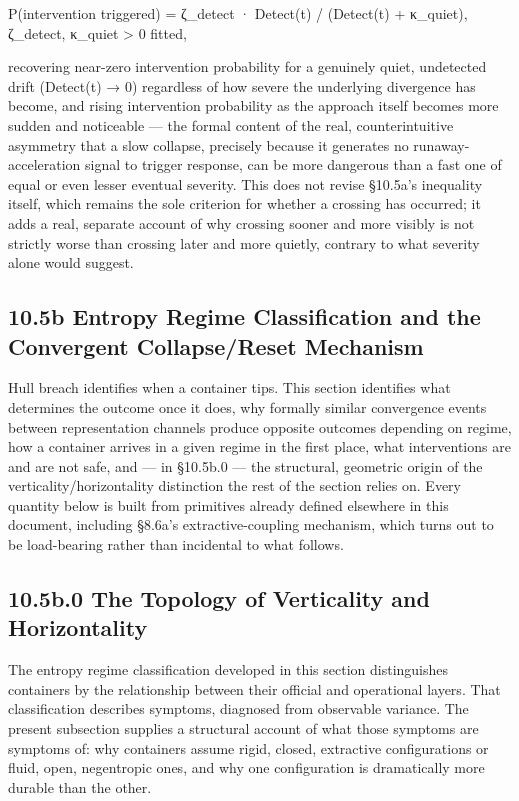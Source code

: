\documentclass[
]{article}
\begin{document}
P(intervention triggered) = ζ\_detect · Detect(t) / (Detect(t) +
κ\_quiet), ζ\_detect, κ\_quiet \textgreater{} 0 fitted,

recovering near-zero intervention probability for a genuinely quiet,
undetected drift (Detect(t) → 0) regardless of how severe the underlying
divergence has become, and rising intervention probability as the
approach itself becomes more sudden and noticeable --- the formal
content of the real, counterintuitive asymmetry that a slow collapse,
precisely because it generates no runaway-acceleration signal to trigger
response, can be more dangerous than a fast one of equal or even lesser
eventual severity. This does not revise §10.5a's inequality itself,
which remains the sole criterion for whether a crossing has occurred; it
adds a real, separate account of why crossing sooner and more visibly is
not strictly worse than crossing later and more quietly, contrary to
what severity alone would suggest.

\hypertarget{b-entropy-regime-classification-and-the-convergent-collapsereset-mechanism}{%
\subsection{10.5b Entropy Regime Classification and the Convergent
Collapse/Reset
Mechanism}\label{b-entropy-regime-classification-and-the-convergent-collapsereset-mechanism}}

Hull breach identifies when a container tips. This section identifies
what determines the outcome once it does, why formally similar
convergence events between representation channels produce opposite
outcomes depending on regime, how a container arrives in a given regime
in the first place, what interventions are and are not safe, and --- in
§10.5b.0 --- the structural, geometric origin of the
verticality/horizontality distinction the rest of the section relies on.
Every quantity below is built from primitives already defined elsewhere
in this document, including §8.6a's extractive-coupling mechanism, which
turns out to be load-bearing rather than incidental to what follows.

\hypertarget{b.0-the-topology-of-verticality-and-horizontality}{%
\subsection{10.5b.0 The Topology of Verticality and
Horizontality}\label{b.0-the-topology-of-verticality-and-horizontality}}

The entropy regime classification developed in this section
distinguishes containers by the relationship between their official and
operational layers. That classification describes symptoms, diagnosed
from observable variance. The present subsection supplies a structural
account of what those symptoms are symptoms of: why containers assume
rigid, closed, extractive configurations or fluid, open, negentropic
ones, and why one configuration is dramatically more durable than the
other.
\end{document}
